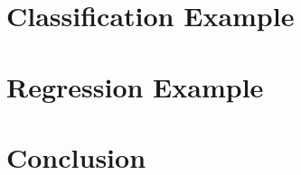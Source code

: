\documentclass[a4paperpaper,twocolumn]{article}
\begin{document}
\section{Classification Example}



\section{Regression Example}





\section{Conclusion}\label{Conclusion}

\printbibliography
\end{document}

